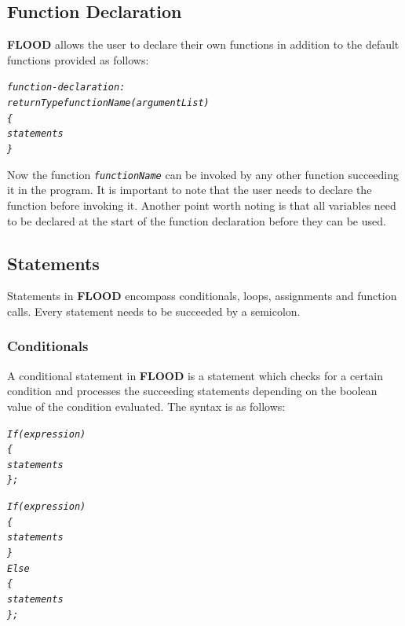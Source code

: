 \documentclass[12pt]{report}
\begin{document}
\subsection{Function Declaration}

\textbf{FLOOD} allows the user to declare their own functions in addition to the default functions provided as follows:

\begin{alltt}\begin{singlespace}
         \textit{function-declaration:}
            \textit{returnType functionName (argumentList)
            \{
                statements
            \}}\end{singlespace}
\end{alltt}

Now the function \texttt{\textit{functionName}} can be invoked by any other function succeeding it in the program. It is important to note that the user needs to declare the function before invoking it.
Another point worth noting is that all variables need to be declared at the start of the function declaration before they can be used. 

\subsection{Statements}

Statements in \textbf{FLOOD} encompass conditionals, loops, assignments and function calls. Every statement needs to be succeeded by a semicolon.

\subsubsection{Conditionals}

A conditional statement in \textbf{FLOOD} is a statement which checks for a certain condition and processes the succeeding statements depending on the boolean value of the condition evaluated. The syntax is as follows:

\begin{alltt}\begin{singlespace}
            \textit{If (expression)
            \{
                statements
            \};}


            \textit{If (expression)
            \{
                statements
            \}
            Else
            \{
                statements
            \};}\end{singlespace}
\end{alltt}
\end{document}
